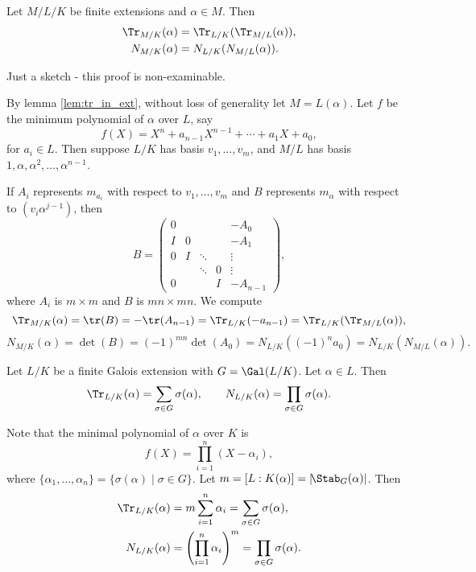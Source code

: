 \documentclass[12pt]{article}
\begin{document}
\begin{theorem}\label{thm:trans_tr}
	Let $M/L/K$ be finite extensions and $\alpha \in M$. Then
	\begin{align*}
		\Tr_{M/K}(\alpha) &= \Tr_{L/K}(\Tr_{M/L}(\alpha)), \\
		N_{M/K}(\alpha) &= N_{L/K}(N_{M/L}(\alpha)).
	\end{align*}
\end{theorem}

\begin{proofbox}
	Just a sketch - this proof is non-examinable.

	By lemma \ref{lem:tr_in_ext}, without loss of generality let $M = L(\alpha)$. Let $f$ be the minimum polynomial of $\alpha$ over $L$, say
	\[
	f(X) = X^{n} + a_{n-1}X^{n-1} + \cdots + a_1 X + a_0,
	\]
	for $a_i \in L$. Then suppose $L/K$ has basis $v_1, \ldots, v_m$, and $M/L$ has basis $1, \alpha, \alpha^2, \ldots, \alpha^{n-1}$.

	If $A_i$ represents $m_{a_i}$ with respect to $v_1, \ldots, v_m$ and $B$ represents $m_\alpha$ with respect to $(v_i \alpha^{j-1})$, then
	\[
	B =
	\begin{pmatrix}
		0 & & & & -A_0 \\
		I & 0 & & & - A_1 \\
		0 & I & \ddots & & \vdots \\
		  & & \ddots & 0 & \vdots \\
		0 & & & I & -A_{n-1}
	\end{pmatrix},
	\]
	where $A_i$ is $m \times m$ and $B$ is $mn \times mn$. We compute
	\[
	\Tr_{M/K}(\alpha) = \tr(B) = - \tr(A_{n-1}) = \Tr_{L/K}(-a_{n-1}) = \Tr_{L/K}(\Tr_{M/L}(\alpha)),
	\]
	\[
	N_{M/K}(\alpha) = \det(B) = (-1)^{mn} \det(A_0) = N_{L/K}((-1)^{n}a_0) = N_{L/K}(N_{M/L}(\alpha)).
	\]
\end{proofbox}

\begin{theorem}
	Let $L/K$ be a finite Galois extension with $G = \Gal(L/K)$. Let $\alpha \in L$. Then
	\[
	\Tr_{L/K}(\alpha) = \sum_{\sigma \in G}\sigma(\alpha), \qquad N_{L/K}(\alpha) = \prod_{\sigma \in G} \sigma(\alpha).
	\]
\end{theorem}

\begin{proofbox}
	Note that the minimal polynomial of $\alpha$ over $K$ is
	\[
	f(X) = \prod_{i = 1}^{n}(X - \alpha_i),
	\]
	where $\{\alpha_1, \ldots, \alpha_n\} = \{\sigma(\alpha) \mid \sigma \in G\}$. Let $m = [L:K(\alpha)] = |\!\Stab_G(\alpha)|$. Then
	\begin{align*}
		\Tr_{L/K}(\alpha) &= m \sum_{i = 1}^{n} \alpha_i = \sum_{\sigma \in G}\sigma(\alpha), \\
		N_{L/K}(\alpha) &= \Biggl(\prod_{i = 1}^{n} \alpha_i \Biggr)^{m} = \prod_{\sigma \in G} \sigma(\alpha).
	\end{align*}
\end{proofbox}
\end{document}
